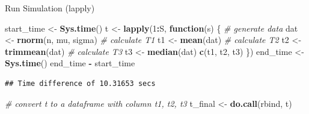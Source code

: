 \documentclass[
  ignorenonframetext,
]{beamer}
\newenvironment{Shaded}{\begin{snugshade}}{\end{snugshade}}
\newcommand{\CommentTok}[1]{\textcolor[rgb]{0.56,0.35,0.01}{\textit{#1}}}
\newcommand{\ControlFlowTok}[1]{\textcolor[rgb]{0.13,0.29,0.53}{\textbf{#1}}}
\newcommand{\DecValTok}[1]{\textcolor[rgb]{0.00,0.00,0.81}{#1}}
\newcommand{\FunctionTok}[1]{\textcolor[rgb]{0.13,0.29,0.53}{\textbf{#1}}}
\newcommand{\NormalTok}[1]{#1}
\newcommand{\OtherTok}[1]{\textcolor[rgb]{0.56,0.35,0.01}{#1}}
\newcommand{\SpecialCharTok}[1]{\textcolor[rgb]{0.81,0.36,0.00}{\textbf{#1}}}
\begin{document}
\begin{frame}[fragile]{Run Simulation (lapply)}
\protect{}\label{run-simulation-lapply}
\small

\begin{Shaded}
\begin{Highlighting}[]
\NormalTok{start\_time }\OtherTok{\textless{}{-}} \FunctionTok{Sys.time}\NormalTok{()}
\NormalTok{t }\OtherTok{\textless{}{-}} \FunctionTok{lapply}\NormalTok{(}\DecValTok{1}\SpecialCharTok{:}\NormalTok{S, }\ControlFlowTok{function}\NormalTok{(s) \{}
  \CommentTok{\# generate data}
\NormalTok{  dat }\OtherTok{\textless{}{-}} \FunctionTok{rnorm}\NormalTok{(n, mu, sigma)}
  \CommentTok{\# calculate T1}
\NormalTok{  t1 }\OtherTok{\textless{}{-}} \FunctionTok{mean}\NormalTok{(dat)}
  \CommentTok{\# calculate T2}
\NormalTok{  t2 }\OtherTok{\textless{}{-}} \FunctionTok{trimmean}\NormalTok{(dat)}
  \CommentTok{\# calculate T3}
\NormalTok{  t3 }\OtherTok{\textless{}{-}} \FunctionTok{median}\NormalTok{(dat)}
  \FunctionTok{c}\NormalTok{(t1, t2, t3)}
\NormalTok{\})}
\NormalTok{end\_time }\OtherTok{\textless{}{-}} \FunctionTok{Sys.time}\NormalTok{()}
\NormalTok{end\_time }\SpecialCharTok{{-}}\NormalTok{ start\_time}
\end{Highlighting}
\end{Shaded}

\begin{verbatim}
## Time difference of 10.31653 secs
\end{verbatim}

\begin{Shaded}
\begin{Highlighting}[]
\CommentTok{\# convert t to a dataframe with column t1, t2, t3}
\NormalTok{t\_final }\OtherTok{\textless{}{-}} \FunctionTok{do.call}\NormalTok{(rbind, t)}
\end{Highlighting}
\end{Shaded}
\end{frame}
\end{document}
